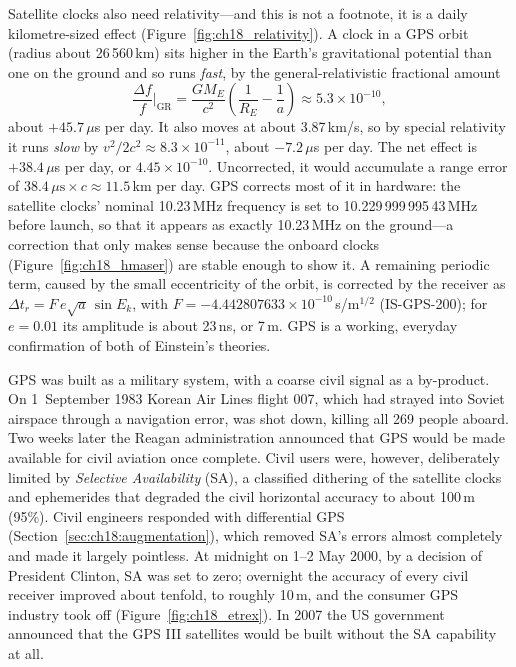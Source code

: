 Satellite clocks also need relativity---and this is not a footnote, it is a daily kilometre-sized
effect (Figure~\ref{fig:ch18_relativity}). A clock in a GPS orbit (radius about 26\,560\,km) sits
higher in the Earth's gravitational potential than one on the ground and so runs \emph{fast},
by the general-relativistic fractional amount
\begin{equation}
\frac{\Delta f}{f}\bigg|_{\text{GR}}=\frac{GM_E}{c^2}\left(\frac1{R_E}-\frac1a\right)\approx5.3\times10^{-10},
\end{equation}
about $+45.7\,\mu$s per day. It also moves at about 3.87\,km/s, so by special relativity it runs
\emph{slow} by $v^2/2c^2\approx8.3\times10^{-11}$, about $-7.2\,\mu$s per day. The net effect is
$+38.4\,\mu$s per day, or $4.45\times10^{-10}$. Uncorrected, it would accumulate a range error
of $38.4\,\mu\text{s}\times c\approx11.5$\,km per day. GPS corrects most of it in hardware:
the satellite clocks' nominal 10.23\,MHz frequency is set to 10.229\,999\,995\,43\,MHz before
launch, so that it appears as exactly 10.23\,MHz on the ground---a correction that only makes
sense because the onboard clocks (Figure~\ref{fig:ch18_hmaser}) are stable enough to show it. A remaining periodic term,
caused by the small eccentricity of the orbit, is corrected by the receiver as
$\Delta t_r=F\,e\sqrt{a}\,\sin E_k$, with $F=-4.442807633\times10^{-10}$\,s/m$^{1/2}$ (IS-GPS-200);
for $e=0.01$ its amplitude is about 23\,ns, or 7\,m. GPS is a working, everyday confirmation of
both of Einstein's theories.


\begin{history}
GPS was built as a military system, with a coarse civil signal as a by-product. On 1~September
1983 Korean Air Lines flight 007, which had strayed into Soviet airspace through a navigation
error, was shot down, killing all 269 people aboard. Two weeks later the Reagan
administration announced that GPS would be made available for civil aviation once complete.
Civil users were, however, deliberately limited by \emph{Selective Availability} (SA), a
classified dithering of the satellite clocks and ephemerides that degraded the civil
horizontal accuracy to about 100\,m (95\%). Civil engineers responded with differential GPS
(Section~\ref{sec:ch18:augmentation}), which removed SA's errors almost completely and made
it largely pointless. At midnight on 1--2 May 2000, by a decision of President Clinton, SA
was set to zero; overnight the accuracy of every civil receiver improved about tenfold, to
roughly 10\,m, and the consumer GPS industry took off (Figure~\ref{fig:ch18_etrex}). In 2007 the
US government announced that the GPS III satellites would be built without the SA capability at
all.
\end{history}

